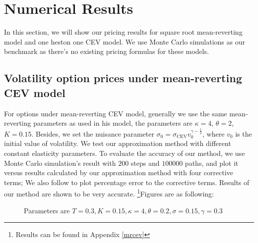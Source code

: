 \chapter{Numerical Results}

In this section, we will show our pricing results for square root mean-reverting model and one heston one CEV model. We use Monte Carlo simulations as our benchmark as there's no existing pricing formulas for these models.

\section{Volatility option prices under mean-reverting CEV model}

For options under mean-reverting CEV model, generally we use the same mean-reverting parameters as \cite{grunbichler_valuing_1996} used in his model, the parameters are $\kappa=4$, $\theta=2$, $K=0.15$. Besides, we set the nuisance parameter $\sigma_0 = \sigma_{\text{CEV}} v_0^{\gamma-\frac{1}{2}}$, where $v_0$ is the initial value of volatility. We test our approximation method with different constant elasticity parameters. To evaluate the accuracy of our method, we use Monte Carlo simulation's result with $200$ steps and $100000$ paths, and plot it versus results calculated by our approximation method with four corrective terms; We also follow \cite{kristensen_adding_2011} to plot percentage error to the corrective terms. Results of our method are shown to be very accurate. \footnote{Results can be found in Appendix \ref{mrcev}}{Figures are as following}:

\begin{figure}[!tbp]
    \centering
    \hfill
    \caption{Parameters are $T=0.3,K=0.15, \kappa=4,\theta=0.2, \sigma=0.15, \gamma=0.3$}
  \end{figure}

